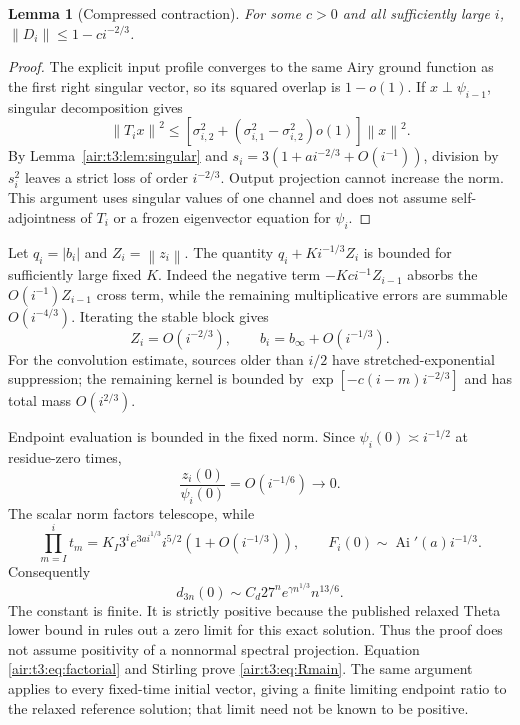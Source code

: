 \documentclass[11pt,letterpaper]{article}
\numberwithin{equation}{section}
\newtheorem{lemma}[theorem]{Lemma}
\theoremstyle{remark}
\newcommand{\Ai}{\operatorname{Ai}}
\newcommand{\norm}[1]{\left\lVert#1\right\rVert}
\begin{document}
\begin{lemma}[Compressed contraction]\label{air:t3:lem:compression}
For some $c>0$ and all sufficiently large $i$,
$\norm{D_i}\le1-ci^{-2/3}$.
\end{lemma}
\begin{proof}
The explicit input profile converges to the same Airy ground function as the first right singular vector, so its squared overlap is $1-o(1)$. If $x\perp\psi_{i-1}$, singular decomposition gives
\[
\norm{T_i x}^2\le
[\sigma_{i,2}^2+(\sigma_{i,1}^2-\sigma_{i,2}^2)o(1)]\norm{x}^2.
\]
By Lemma~\ref{air:t3:lem:singular} and $s_i=3(1+a i^{-2/3}+O(i^{-1}))$, division by $s_i^2$ leaves a strict loss of order $i^{-2/3}$. Output projection cannot increase the norm. This argument uses singular values of one channel and does not assume self-adjointness of $T_i$ or a frozen eigenvector equation for $\psi_i$.
\end{proof}

Let $q_i=|b_i|$ and $Z_i=\norm{z_i}$. The quantity $q_i+K i^{-1/3}Z_i$ is bounded for sufficiently large fixed $K$. Indeed the negative term $-Kci^{-1}Z_{i-1}$ absorbs the $O(i^{-1})Z_{i-1}$ cross term, while the remaining multiplicative errors are summable $O(i^{-4/3})$. Iterating the stable block gives
\[
Z_i=O(i^{-2/3}),\qquad b_i=b_\infty+O(i^{-1/3}).
\]
For the convolution estimate, sources older than $i/2$ have stretched-exponential suppression; the remaining kernel is bounded by
$\exp[-c(i-m)i^{-2/3}]$ and has total mass $O(i^{2/3})$.

Endpoint evaluation is bounded in the fixed norm. Since $\psi_i(0)\asymp i^{-1/2}$ at residue-zero times,
\[
\frac{z_i(0)}{\psi_i(0)}=O(i^{-1/6})\longrightarrow0.
\]
The scalar norm factors telescope, while
\[
\prod_{m=I}^i t_m=K_I 3^i e^{3a i^{1/3}}i^{5/2}
(1+O(i^{-1/3})),\qquad F_i(0)\sim\Ai'(a)i^{-1/3}.
\]
Consequently
\begin{equation}\label{air:t3:eq:dmain}
d_{3n}(0)\sim C_d27^n e^{\gamma n^{1/3}}n^{13/6}.
\end{equation}
The constant is finite. It is strictly positive because the published relaxed Theta lower bound in \cite{gdw} rules out a zero limit for this exact solution. Thus the proof does not assume positivity of a nonnormal spectral projection. Equation \eqref{air:t3:eq:factorial} and Stirling prove \eqref{air:t3:eq:Rmain}. The same argument applies to every fixed-time initial vector, giving a finite limiting endpoint ratio to the relaxed reference solution; that limit need not be known to be positive.
\end{document}
